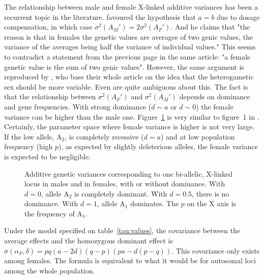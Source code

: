 \documentclass[a4paper,12pt]{article}
\begin{document}
The relationship between male and female X-linked additive variances has been a recurrent topic in the literature. \citet{James1973} favoured the hypothesis that $a=b$ due to dosage compensation, in which case $\sigma^2(A_M') = 2\sigma^2(A_F')$. And he claims that "the reason is that in females the genetic values are averages of two genic values, the variance of the averages being half the variance of individual values." This seems to contradict a statement from the previous page in the same article: "a female genetic value is the sum of two genic values". However, the same argument is reproduced by \citet{Reinhold2013}, who base their whole article on the idea that the heterogametic sex should be more variable. Even \citet[pp. 715f]{Lynch1998} are quite ambiguous about this. The fact is that the relationship between $\sigma^2(A_F')$ and $\sigma^2(A_M')$ depends on dominance and gene frequencies. With strong dominance ($d\sim a$ or $d\sim 0$) the female variance can be higher than the male one. Figure~\ref{fig:variances} is very similar to figure~1 in \citet{Reinhold2013}. Certainly, the parameter space where female variance is higher is not very large. If the low allele, A$_2$, is completely recessive ($d=a$) and at low population frequency (high $p$), as expected by slightly deleterious alleles, the female variance is expected to be negligible.

\begin{figure}
\caption{Additive genetic variances corresponding to one bi-allelic, X-linked locus in males and in females, with or without dominance. With $d=0$, allele A$_2$ is completely dominant. With $d=0.5$, there is no dominance. With $d=1$, allele A$_1$ dominates. The $p$ on the X axis is the frequency of A$_1$.}\label{fig:variances}
\end{figure}

Under the model specified on table~\ref{tau:values}, the covariance between the average effects and the homozygous dominant effect is $\sigma(\alpha_F,\delta) = pq(a-2d)(q-p)(pa-d(p-q))$. This covariance only exists among females. The formula is equivalent to what it would be for autosomal loci among the whole population.





\end{document}

